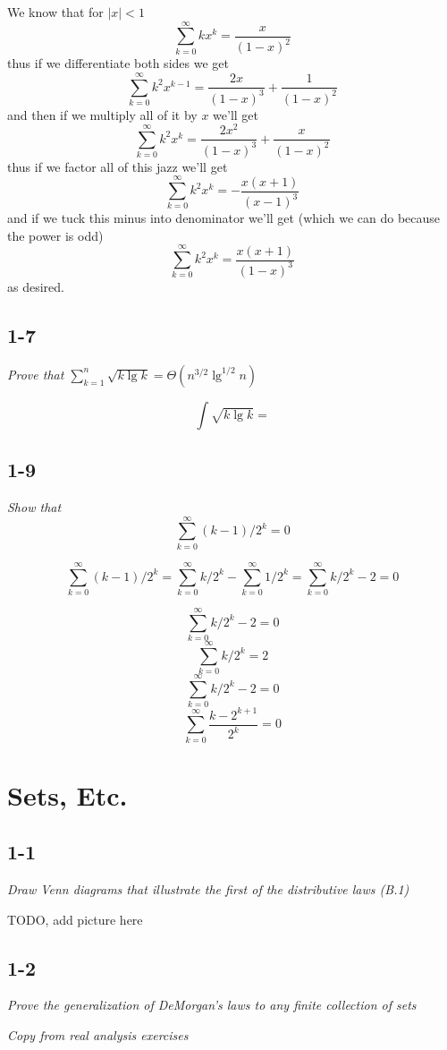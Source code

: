 \documentclass[11pt,oneside,titlepage]{book}
\begin{document}
We know that for $|x| < 1$
$$\sum_{k = 0}^{\infty}{kx^k} = \frac{x}{(1 - x)^2}$$
thus if we differentiate both sides we get
$$\sum_{k = 0}^{\infty}{k^2x^{k - 1}} = \frac{2x}{(1 - x)^3}
+ \frac{1}{(1 - x)^2} $$
and then if we multiply all of it by $x$ we'll get
$$\sum_{k = 0}^{\infty}{k^2x^k} = \frac{2x^2}{(1 - x)^3}
+ \frac{x}{(1 - x)^2} $$
thus if we factor all of this jazz we'll get
$$\sum_{k = 0}^{\infty}{k^2x^k} = - \frac{x(x + 1)}{(x - 1)^3}$$
and if we tuck this minus into denominator we'll get (which we can do because
the power is odd)
$$\sum_{k = 0}^{\infty}{k^2x^k} = \frac{x(x + 1)}{(1 - x)^3}$$
as desired.

\section*{1-7}
\textit{Prove that $\sum_{k = 1}^n{\sqrt{k \lg k}} = \Theta(n^{3/2}\lg^{1/2}n)$}

$$\int \sqrt{k \lg k} = $$

\section*{1-9}
\textit{Show that}
$$\sum_{k = 0}^{\infty}{(k - 1)/2^k} = 0$$

$$\sum_{k = 0}^{\infty}{(k - 1)/2^k} = \sum_{k = 0}^{\infty}{k/2^k} - \sum_{k = 0}^{\infty}{1/2^k} =
\sum_{k = 0}^{\infty}{k/2^k} - 2 = 0$$

$$\sum_{k = 0}^{\infty}{k/2^k} - 2 = 0$$
$$\sum_{k = 0}^{\infty}{k/2^k} = 2$$
$$\sum_{k = 0}^{\infty}{k/2^k - 2} = 0$$
$$\sum_{k = 0}^{\infty}{\frac{k - 2^{k + 1}}{2^k}} = 0$$


\chapter{Sets, Etc.}

\section*{1-1}
\textit{Draw Venn diagrams that illustrate the first of the distributive laws
(B.1)}

TODO, add picture here

\section*{1-2}
\textit{Prove the generalization of DeMorgan's laws to any finite collection
  of sets}

\textit{Copy from real analysis exercises}
\end{document}
